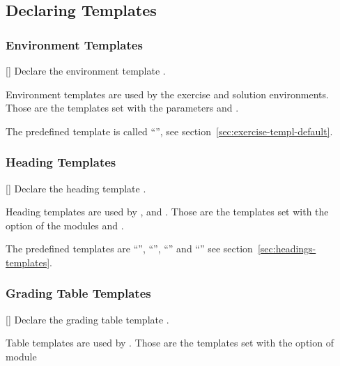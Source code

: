 \documentclass{xsim-manual}
\begin{document}
\subsection{Declaring Templates}
\subsubsection{Environment Templates}\label{sec:envir-templ}
\begin{commands}
  []
    Declare the environment template .
\end{commands}
Environment templates are used by the exercise and solution environments.
Those are the templates set with the parameters 
and .

The predefined template is called \enquote{}, see
section~\vref{sec:exercise-templ-default}.

\subsubsection{Heading Templates}\label{sec:heading-templates}
\begin{commands}
  []
    Declare the heading template .
\end{commands}
Heading templates are used by ,  and
.  Those are the templates set with the option
 of the modules  and
.

The predefined templates are \enquote{},
\enquote{}, \enquote{} and
\enquote{} see section~\vref{sec:headings-templates}.

\subsubsection{Grading Table Templates}\label{sec:grad-table-templ}
\begin{commands}
  []
    Declare the grading table template .
\end{commands}
Table templates are used by .  Those are the templates set
with the option  of module 
\end{document}
